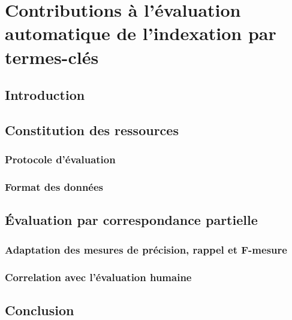 \chapter{Contributions à l'évaluation automatique de l'indexation par termes-clés}
\label{chap:main-automatic_evaluation_of_keyphrase_annotation}
  \section{Introduction}
  \label{sec:main-automatic_evaluation_of_keyphrase_annotation-introduction}


  \section{Constitution des ressources}
  \label{section:main-automatic_evaluation_of_keyphrase_annotation-resource_construction}
    \subsection{Protocole d'évaluation}
    \label{subsec:main-automatic_evaluation_of_keyphrase_annotation-resource_construction-evaluation_protocol}

    \subsection{Format des données}
    \label{subsec:main-automatic_evaluation_of_keyphrase_annotation-resource_construction-data_format}


  \section{Évaluation par correspondance partielle}
  \label{sec:main-automatic_evaluation_of_keyphrase_annotation-evaluation}
    \subsection{Adaptation des mesures de précision, rappel et F-mesure}
    \label{subsec:main-automatic_evaluation_of_keyphrase_annotation-contributions-evaluation-soft_maching_precision_recall_and_f_measure}

    \subsection{Correlation avec l'évaluation humaine}
    \label{subsec:main-automatic_evaluation_of_keyphrase_annotation-contributions-evaluation-correlation}


  \section{Conclusion}
  \label{sec:main-automatic_evaluation_of_keyphrase_annotation-Conclusion}

